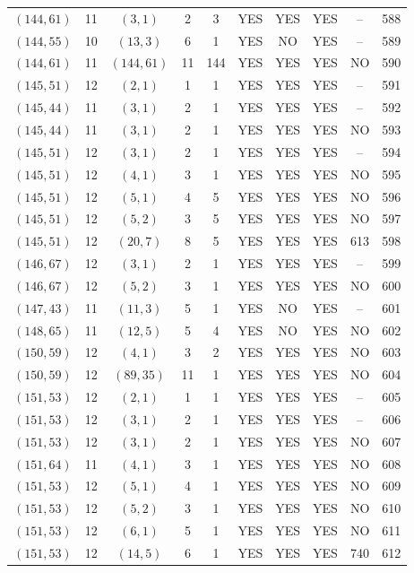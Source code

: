 \begin{longtable}{|c|c|c|c|c|c|c|c|c|c|}
$(144, 61)$ & 11 & $(3, 1)$ & 2 & 3 & YES & YES & YES & -- & 588\\
$(144, 55)$ & 10 & $(13, 3)$ & 6 & 1 & YES & NO & YES & -- & 589\\
$(144, 61)$ & 11 & $(144, 61)$ & 11 & 144 & YES & YES & YES & NO & 590\\
$(145, 51)$ & 12 & $(2, 1)$ & 1 & 1 & YES & YES & YES & -- & 591\\
$(145, 44)$ & 11 & $(3, 1)$ & 2 & 1 & YES & YES & YES & -- & 592\\
$(145, 44)$ & 11 & $(3, 1)$ & 2 & 1 & YES & YES & YES & NO & 593\\
$(145, 51)$ & 12 & $(3, 1)$ & 2 & 1 & YES & YES & YES & -- & 594\\
$(145, 51)$ & 12 & $(4, 1)$ & 3 & 1 & YES & YES & YES & NO & 595\\
$(145, 51)$ & 12 & $(5, 1)$ & 4 & 5 & YES & YES & YES & NO & 596\\
$(145, 51)$ & 12 & $(5, 2)$ & 3 & 5 & YES & YES & YES & NO & 597\\
$(145, 51)$ & 12 & $(20, 7)$ & 8 & 5 & YES & YES & YES & 613 & 598\\
$(146, 67)$ & 12 & $(3, 1)$ & 2 & 1 & YES & YES & YES & -- & 599\\
$(146, 67)$ & 12 & $(5, 2)$ & 3 & 1 & YES & YES & YES & NO & 600\\
$(147, 43)$ & 11 & $(11, 3)$ & 5 & 1 & YES & NO & YES & -- & 601\\
$(148, 65)$ & 11 & $(12, 5)$ & 5 & 4 & YES & NO & YES & NO & 602\\
$(150, 59)$ & 12 & $(4, 1)$ & 3 & 2 & YES & YES & YES & NO & 603\\
$(150, 59)$ & 12 & $(89, 35)$ & 11 & 1 & YES & YES & YES & NO & 604\\
$(151, 53)$ & 12 & $(2, 1)$ & 1 & 1 & YES & YES & YES & -- & 605\\
$(151, 53)$ & 12 & $(3, 1)$ & 2 & 1 & YES & YES & YES & -- & 606\\
$(151, 53)$ & 12 & $(3, 1)$ & 2 & 1 & YES & YES & YES & NO & 607\\
$(151, 64)$ & 11 & $(4, 1)$ & 3 & 1 & YES & YES & YES & NO & 608\\
$(151, 53)$ & 12 & $(5, 1)$ & 4 & 1 & YES & YES & YES & NO & 609\\
$(151, 53)$ & 12 & $(5, 2)$ & 3 & 1 & YES & YES & YES & NO & 610\\
$(151, 53)$ & 12 & $(6, 1)$ & 5 & 1 & YES & YES & YES & NO & 611\\
$(151, 53)$ & 12 & $(14, 5)$ & 6 & 1 & YES & YES & YES & 740 & 612\\

\end{longtable}
